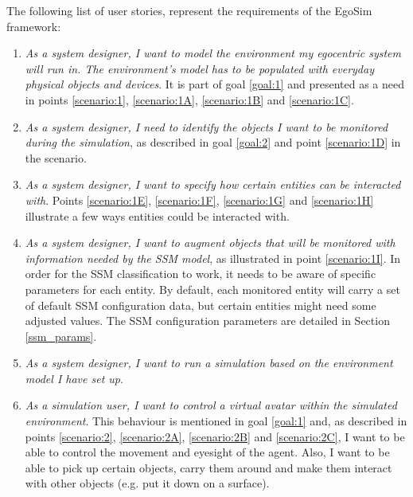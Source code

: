 The following list of user stories, represent the requirements of the EgoSim framework:
\begin{enumerate}
	\item[\textlabel{1.}{us:1}] \emph{As a system designer, I want to model the environment my egocentric system will run in. The environment's model has to be populated with everyday physical objects and devices}. It is part of goal \ref{goal:1} and presented as a need in points \ref{scenario:1}, \ref{scenario:1A}, \ref{scenario:1B} and \ref{scenario:1C}.

	\item[\textlabel{2.}{us:2}] \emph{As a system designer, I need to identify the objects I want to be monitored during the simulation}, as described in goal \ref{goal:2} and point \ref{scenario:1D} in the scenario.

	\item[\textlabel{2.1}{us:2.1}] \emph{As a system designer, I want to specify how certain entities can be interacted with}. Points \ref{scenario:1E}, \ref{scenario:1F}, \ref{scenario:1G} and \ref{scenario:1H} illustrate a few ways entities could be interacted with.

	\item[\textlabel{2.2.}{us:2.2}] \emph{As a system designer, I want to augment objects that will be monitored with information needed by the SSM model}, as illustrated in point \ref{scenario:1I}. In order for the SSM classification to work, it needs to be aware of specific parameters for each entity. By default, each monitored entity will carry a set of default SSM configuration data, but certain entities might need some adjusted values. The SSM configuration parameters are detailed in Section \ref{ssm_params}.

	\item[\textlabel{3.}{us:3}] \emph{As a system designer, I want to run a simulation based on the environment model I have set up}.

	\item[\textlabel{4.}{us:4}] \emph{As a simulation user, I want to control a virtual avatar within the simulated environment}. This behaviour is mentioned in goal \ref{goal:1} and, as described in points \ref{scenario:2}, \ref{scenario:2A}, \ref{scenario:2B} and \ref{scenario:2C}, I want to be able to control the movement and eyesight of the agent. Also, I want to be able to pick up certain objects, carry them around and make them interact with other objects (e.g. put it down on a surface).


\end{enumerate}
